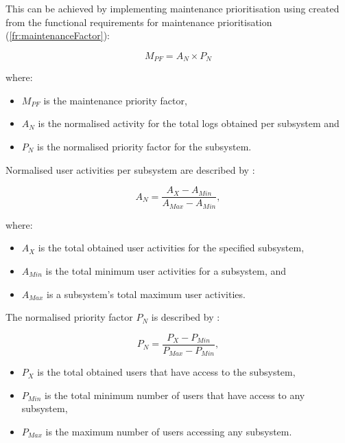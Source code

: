 This can be achieved by implementing maintenance prioritisation using  created from the functional requirements for maintenance prioritisation (\ref{fr:maintenanceFactor}):

\begin{equation}
	\label{eq:ch2_maintenanceFactorSimplified}
	M_{PF} = A_{N} \times P_{N}
\end{equation}

where:

\begin{itemize}
	\item $M_{PF}$ is the maintenance priority factor,
	\item $A_{N}$ is the normalised activity for the total logs obtained per subsystem and
	\item $P_{N}$ is the normalised priority factor for the subsystem.
\end{itemize}

Normalised user activities per subsystem are described by :

\begin{equation}
	\label{eq:ch2_eventNormalised}
	A_{N} = \frac{A_X - A_{Min}}{A_{Max} - A_{Min}},
\end{equation}

where:

\begin{itemize}
	\item $A_X$ is the total obtained user activities for the specified subsystem,
	\item $A_{Min}$ is the total minimum user activities for a subsystem, and
	\item $A_{Max}$ is a subsystem's total maximum user activities.
\end{itemize}

The normalised priority factor $P_N$ is described by :

\begin{equation}
	\label{eq:ch2_priorityNormalised}
	P_{N} = \frac{P_X - P_{Min}}{P_{Max} - P_{Min}},
\end{equation}

\begin{itemize}
	\item $P_X$ is the total obtained users that have access to the subsystem,
	\item $P_{Min}$ is the total minimum number of users that have access to any subsystem,
	\item $P_{Max}$ is the maximum number of users accessing any subsystem.
\end{itemize}

